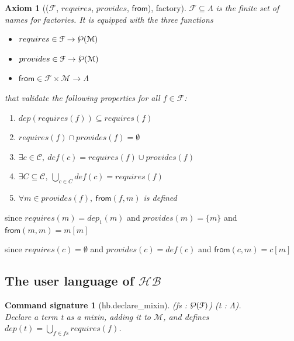 \documentclass[a4paper,UKenglish,cleveref, autoref]{lipics-v2019}
\newcommand{\HB}{\ensuremath{\mathcal{HB}}}
\newcommand{\Lang}{\ensuremath{\Lambda}}
\newcommand{\mixin}{mixin}
\newcommand{\M}{\ensuremath{\mathcal{M}}}
\newcommand{\factory}{factory}
\newcommand{\factories}{factories}
\newcommand{\F}{\ensuremath{\mathcal{F}}}
\newcommand{\dep}{\ensuremath{dep}}
\newcommand{\depone}{\ensuremath{dep_1}}
\newcommand{\powerset}[1]{\raisebox{.15\baselineskip}{\Large\ensuremath{\wp}}(#1)}
\newcommand{\C}{\ensuremath{\mathcal{C}}}
\newcommand{\cdef}{\ensuremath{def}}
\newcommand{\requires}{\ensuremath{requires}}
\newcommand{\provides}{\ensuremath{provides}}
\newcommand{\from}{\ensuremath{\mathsf{from}}}
\newcommand{\proj}[2]{\ensuremath{#1[#2]}}
\theoremstyle{implem}
\theoremstyle{implem}
\newcounter{axiomcounter}
\theoremstyle{axiom}
\newtheorem{axiom}[axiomcounter]{Axiom}
\theoremstyle{abscommand}
\newtheorem*{abscommand}{Command signature}
\theoremstyle{command}
\begin{document}
\begin{axiom}[(\F{}, \requires{}, \provides{}, \from{}), \factory{}]\label{def:factory}
  \(\F{} \subseteq \Lang{} \) is the finite set of names for \factories{}.
  It is equipped with the three functions
  \begin{itemize}
    \item\( \requires{} \in \F{} \to \powerset\M{} \)
    \item\( \provides{} \in \F{} \to \powerset\M{} \)
    \item\( \from{} \in \F{} \times \M{} \to \Lang{} \)
  \end{itemize}
  that validate the following properties for all \(f \in \F{}\):
  \begin{enumerate}
    \item\( \dep{}(\requires{}(f)) \subseteq \requires{}(f)\)
    \item\( \requires{}(f) \cap \provides{}(f) = \emptyset \)
    \item\( \exists c \in \C{},~ \cdef{}(c) = \requires{}(f) \cup \provides{}(f) \)
    \item\( \exists C \subseteq \C{},~\bigcup_{c\in C}\cdef{}(c) = \requires{}(f)\)
    \item\( \forall m \in \provides{}(f),~ \from{}(f,m) \) is defined
  \end{enumerate}
\end{axiom}

\begin{proposition}[\( \M{} \subseteq \F{} \)]
  since \(\requires{}(m) = \depone{}(m)\)
  and \(\provides{}(m) = \{m\} \)
  and \(\from{}(m,m) = \proj{m}{m} \)
\end{proposition}

\begin{proposition}[\( \C{} \subseteq \F{} \)]
  since \(\requires{}(c) = \emptyset \)
  and \(\provides{}(c) = \cdef{}(c) \)
  and \(\from{}(c,m) = \proj{c}{m} \)
\end{proposition}

\subsection{The user language of \HB{}}

\begin{abscommand}[hb.declare_mixin] (fs : $\powerset\F{}$) (t : \Lang{}).\\
Declare a term t as a \mixin{}, adding it to \M{}, and defines
\( \dep{}(t) = \bigcup_{f \in fs} \requires{}(f) \).
\end{abscommand}
\end{document}
